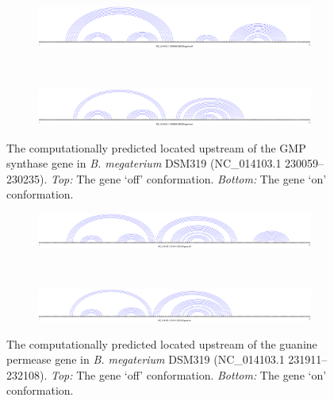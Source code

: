 \begin{figure}[!ht]
\centering
\begin{subfigure}[h]{\textwidth}
\centering
\includegraphics[width=.9\textwidth]{Figures/Ribofinder/NC_014103_1_230059_230235_OFF.pdf}
\end{subfigure} \\
\medskip
\begin{subfigure}[h]{\textwidth}
\centering
\includegraphics[width=.9\textwidth]{Figures/Ribofinder/NC_014103_1_230059_230235_ON.pdf}
\end{subfigure}
\caption[Structures for the putative \rb located upstream of the GMP synthase gene in {\em B. megaterium} DSM319]{The computationally predicted \rb located upstream of the GMP synthase
gene in {\em B. megaterium} DSM319 (NC\_014103.1 230059--230235).
{\em Top:} The gene `off' conformation. {\em Bottom:} The gene `on' conformation.}
\label{fig:figure:NC_014103_1_230059_230235}
\end{figure}
\medskip

\begin{figure}[!ht]
\centering
\begin{subfigure}[h]{\textwidth}
\centering
\includegraphics[width=.9\textwidth]{Figures/Ribofinder/NC_014103_1_231911_232108_OFF.pdf}
\end{subfigure} \\
\medskip
\begin{subfigure}[h]{\textwidth}
\centering
\includegraphics[width=.9\textwidth]{Figures/Ribofinder/NC_014103_1_231911_232108_ON.pdf}
\end{subfigure}
\caption[Structures for the putative \rb located upstream of the guanine permease gene in {\em B. megaterium} DSM319]{The computationally predicted \rb located upstream of the guanine permease
gene in {\em B. megaterium} DSM319 (NC\_014103.1 231911--232108).
{\em Top:} The gene `off' conformation. {\em Bottom:} The gene `on' conformation.}
\label{fig:figure:NC_014103_1_231911_232108}
\end{figure}
\medskip

